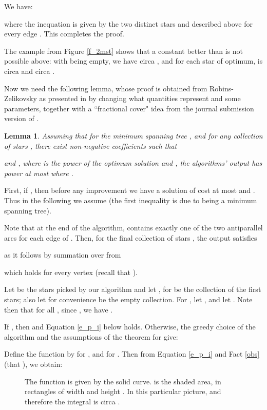 \documentclass[12pt]{article}
\def\qed{ \ \vrule width.2cm height.2cm depth0cm\smallskip}
\def\proof{\noindent {\bf Proof. \ }}
\newtheorem{lemma}[proposition]{Lemma}
\begin{document}
We have:

where the inequation is given by the two distinct stars  and 
described above for every edge .
This completes the proof.
\qed

The example from Figure \ref{f_2mst} shows that a constant
better than  is not possible above:
with  being empty, we have  circa , and for each star 
of optimum,  is circa  and  circa .


Now we need the following lemma, whose proof is obtained from 
Robins-Zelikovsky as presented in \cite{GroplHNP01} by changing 
what quantities represent and some parameters,
together with a ``fractional cover" idea from 
the journal submission version of \cite{BGRS10}.

\begin{lemma}
Assuming that for the minimum spanning tree ,
and for any collection of stars ,
there exist non-negative coefficients  such that
 
and ,
where  is the power of the optimum solution and , 
the algorithms' output has power at most  
where . 
\label{l_zel}
\end{lemma}
\proof
First, if , then before any improvement 
we have a solution of cost at most  and .
Thus in the following we assume 
(the first inequality is due to  being a minimum spanning tree).

Note that at the end of the algorithm, 
 contains exactly one of the two antiparallel
arcs for each edge of . Then,
for the final collection of stars , the output  satisfies

as it follows by summation over  from

which holds for every vertex  
(recall that ).
 


Let  be the stars picked by our algorithm
and  let , for  be the collection of the first
 stars; also let for convenience  be the empty collection.
For , let , 
and let .
Note then that for all , since 
,
we have .

If , then  and Equation \ref{e_p_i} below holds. Otherwise,
the greedy choice of the algorithm and the assumptions of the theorem
for  give:


Define the function  by
 for ,
and  for .
Then from Equation \ref{e_p_i} and Fact \ref{obs}
(that ), we obtain:


\begin{figure}[bht]
\begin{center}\leavevmode {}
\end{center}
\caption{
The function  is given by the solid curve.
 is the shaded area, in rectangles of width 
and height 
.
In this particular picture,  and therefore
the integral is circa .
}\label{f_integral}
\end{figure}
\end{document}

